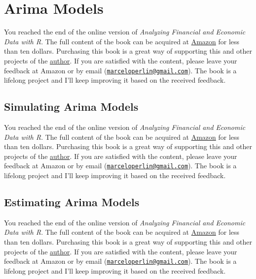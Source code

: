 \documentclass[
  12pt,
]{book}
\newenvironment{pleasebuyit}
{\begin{noteblock}
		
	} {\end{noteblock}}
\begin{document}
\hypertarget{arima-models}{%
\section{Arima Models}\label{arima-models}}

\begin{pleasebuyit}
You reached the end of the online version of \emph{Analyzing Financial
and Economic Data with R}. The full content of the book can be acquired
at \href{https://www.amazon.com/dp/B084LSNXMN}{Amazon} for less than ten
dollars. Purchasing this book is a great way of supporting this and
other projects of the \href{https://www.msperlin.com/blog/}{author}. If
you are satisfied with the content, please leave your feedback at Amazon
or by email
(\href{mailto:marceloperlin@gmail.com}{\nolinkurl{marceloperlin@gmail.com}}).
The book is a lifelong project and I'll keep improving it based on the
received feedback.
\end{pleasebuyit}

\hypertarget{simulating-arima-models}{%
\subsection{Simulating Arima Models}\label{simulating-arima-models}}

\begin{pleasebuyit}
You reached the end of the online version of \emph{Analyzing Financial
and Economic Data with R}. The full content of the book can be acquired
at \href{https://www.amazon.com/dp/B084LSNXMN}{Amazon} for less than ten
dollars. Purchasing this book is a great way of supporting this and
other projects of the \href{https://www.msperlin.com/blog/}{author}. If
you are satisfied with the content, please leave your feedback at Amazon
or by email
(\href{mailto:marceloperlin@gmail.com}{\nolinkurl{marceloperlin@gmail.com}}).
The book is a lifelong project and I'll keep improving it based on the
received feedback.
\end{pleasebuyit}

\hypertarget{arima-estimating}{%
\subsection{Estimating Arima Models}\label{arima-estimating}}

\begin{pleasebuyit}
You reached the end of the online version of \emph{Analyzing Financial
and Economic Data with R}. The full content of the book can be acquired
at \href{https://www.amazon.com/dp/B084LSNXMN}{Amazon} for less than ten
dollars. Purchasing this book is a great way of supporting this and
other projects of the \href{https://www.msperlin.com/blog/}{author}. If
you are satisfied with the content, please leave your feedback at Amazon
or by email
(\href{mailto:marceloperlin@gmail.com}{\nolinkurl{marceloperlin@gmail.com}}).
The book is a lifelong project and I'll keep improving it based on the
received feedback.
\end{pleasebuyit}
\end{document}
